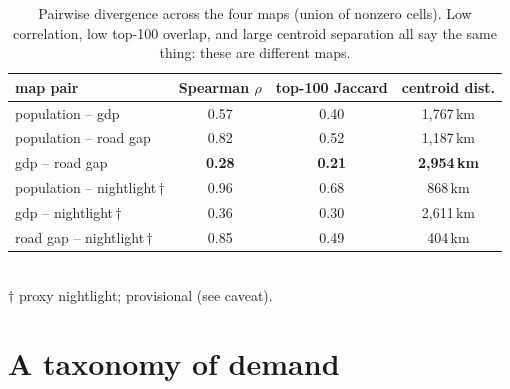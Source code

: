 \begin{table}[t]
  \centering\small
  \caption{Pairwise divergence across the four maps (union of nonzero
  cells). Low correlation, low top-100 overlap, and large centroid
  separation all say the same thing: these are different maps.
  }
  \label{tab:divergence}
  \begin{tabular}{lccc}
    \toprule
    map pair & Spearman $\rho$ & top-100 Jaccard & centroid dist. \\
    \midrule
    population -- gdp            & 0.57 & 0.40 & 1{,}767\,km \\
    population -- road gap       & 0.82 & 0.52 & 1{,}187\,km \\
    gdp -- road gap              & \textbf{0.28} & \textbf{0.21} & \textbf{2{,}954\,km} \\
    \addlinespace
    population -- nightlight\,$\dagger$ & 0.96 & 0.68 & 868\,km \\
    gdp -- nightlight\,$\dagger$        & 0.36 & 0.30 & 2{,}611\,km \\
    road gap -- nightlight\,$\dagger$   & 0.85 & 0.49 & 404\,km \\
    \bottomrule
  \end{tabular}
  \\[2pt]
  {\footnotesize $\dagger$ proxy nightlight; provisional (see caveat).}
\end{table}



\section{A taxonomy of demand}       %
\label{sec:taxonomy}

